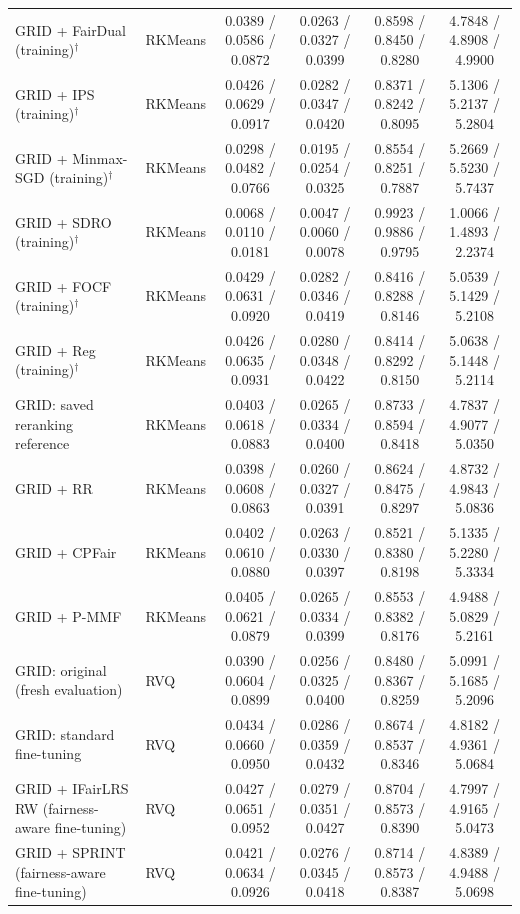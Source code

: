 \begin{table}[p]
{\begin{tabular}{llcccc}
GRID + FairDual (training)$^{\dagger}$ & RKMeans & 0.0389 / 0.0586 / 0.0872 & 0.0263 / 0.0327 / 0.0399 & 0.8598 / 0.8450 / 0.8280 & 4.7848 / 4.8908 / 4.9900 \\
GRID + IPS (training)$^{\dagger}$ & RKMeans & 0.0426 / 0.0629 / 0.0917 & 0.0282 / 0.0347 / 0.0420 & 0.8371 / 0.8242 / 0.8095 & 5.1306 / 5.2137 / 5.2804 \\
GRID + Minmax-SGD (training)$^{\dagger}$ & RKMeans & 0.0298 / 0.0482 / 0.0766 & 0.0195 / 0.0254 / 0.0325 & 0.8554 / 0.8251 / 0.7887 & 5.2669 / 5.5230 / 5.7437 \\
GRID + SDRO (training)$^{\dagger}$ & RKMeans & 0.0068 / 0.0110 / 0.0181 & 0.0047 / 0.0060 / 0.0078 & 0.9923 / 0.9886 / 0.9795 & 1.0066 / 1.4893 / 2.2374 \\
GRID + FOCF (training)$^{\dagger}$ & RKMeans & 0.0429 / 0.0631 / 0.0920 & 0.0282 / 0.0346 / 0.0419 & 0.8416 / 0.8288 / 0.8146 & 5.0539 / 5.1429 / 5.2108 \\
GRID + Reg (training)$^{\dagger}$ & RKMeans & 0.0426 / 0.0635 / 0.0931 & 0.0280 / 0.0348 / 0.0422 & 0.8414 / 0.8292 / 0.8150 & 5.0638 / 5.1448 / 5.2114 \\
GRID: saved reranking reference & RKMeans & 0.0403 / 0.0618 / 0.0883 & 0.0265 / 0.0334 / 0.0400 & 0.8733 / 0.8594 / 0.8418 & 4.7837 / 4.9077 / 5.0350 \\
GRID + RR & RKMeans & 0.0398 / 0.0608 / 0.0863 & 0.0260 / 0.0327 / 0.0391 & 0.8624 / 0.8475 / 0.8297 & 4.8732 / 4.9843 / 5.0836 \\
GRID + CPFair & RKMeans & 0.0402 / 0.0610 / 0.0880 & 0.0263 / 0.0330 / 0.0397 & 0.8521 / 0.8380 / 0.8198 & 5.1335 / 5.2280 / 5.3334 \\
GRID + P-MMF & RKMeans & 0.0405 / 0.0621 / 0.0879 & 0.0265 / 0.0334 / 0.0399 & 0.8553 / 0.8382 / 0.8176 & 4.9488 / 5.0829 / 5.2161 \\
\midrule
GRID: original (fresh evaluation) & RVQ & 0.0390 / 0.0604 / 0.0899 & 0.0256 / 0.0325 / 0.0400 & 0.8480 / 0.8367 / 0.8259 & 5.0991 / 5.1685 / 5.2096 \\
GRID: standard fine-tuning & RVQ & 0.0434 / 0.0660 / 0.0950 & 0.0286 / 0.0359 / 0.0432 & 0.8674 / 0.8537 / 0.8346 & 4.8182 / 4.9361 / 5.0684 \\
GRID + IFairLRS RW (fairness-aware fine-tuning) & RVQ & 0.0427 / 0.0651 / 0.0952 & 0.0279 / 0.0351 / 0.0427 & 0.8704 / 0.8573 / 0.8390 & 4.7997 / 4.9165 / 5.0473 \\
GRID + SPRINT (fairness-aware fine-tuning) & RVQ & 0.0421 / 0.0634 / 0.0926 & 0.0276 / 0.0345 / 0.0418 & 0.8714 / 0.8573 / 0.8387 & 4.8389 / 4.9488 / 5.0698 \\

\end{tabular}}
\end{table}
